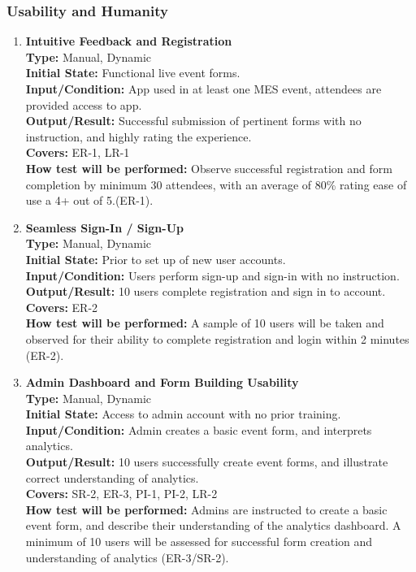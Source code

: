 \documentclass[12pt, titlepage]{article}
\begin{document}
\subsubsection{Usability and Humanity}
\begin{enumerate}[label=\bfseries UH-\arabic*:, wide=0pt]
  \item \label{test-UH1} \textbf{Intuitive Feedback and Registration}\\[2mm]
    {\bf Type:} Manual, Dynamic\\
    {\bf Initial State:} Functional live event forms.\\
    {\bf Input/Condition:} App used in at least one MES event, attendees are provided access to app.\\
    {\bf Output/Result:} Successful submission of pertinent forms with no instruction, and highly rating the experience.\\
    {\bf Covers:} ER-1, LR-1\\
    {\bf How test will be performed:} Observe successful registration and form completion by minimum 30 attendees, with an average of 80\% rating ease of use a 4+ out of 5.(ER-1).
  
  \item \label{test-UH2} \textbf{Seamless Sign-In / Sign-Up}\\[2mm]
    {\bf Type:} Manual, Dynamic\\
    {\bf Initial State:} Prior to set up of new user accounts.\\
    {\bf Input/Condition:} Users perform sign-up and sign-in with no instruction.\\
    {\bf Output/Result:} 10 users complete registration and sign in to account.\\
    {\bf Covers:} ER-2\\
    {\bf How test will be performed:} A sample of 10 users will be taken and observed for their ability to complete registration and login within 2 minutes (ER-2).

  \item \label{test-UH3} \textbf{Admin Dashboard and Form Building Usability}\\[2mm]
    {\bf Type:} Manual, Dynamic\\
    {\bf Initial State:} Access to admin account with no prior training.\\
    {\bf Input/Condition:} Admin creates a basic event form, and interprets analytics.\\
    {\bf Output/Result:} 10 users successfully create event forms, and illustrate correct understanding of analytics.\\
    {\bf Covers:} SR-2, ER-3, PI-1, PI-2, LR-2\\
    {\bf How test will be performed:} Admins are instructed to create a basic event form, and describe their understanding of the analytics dashboard. A minimum of 10 users will be assessed for successful form creation and understanding of analytics (ER-3/SR-2).


\end{enumerate}
\end{document}
